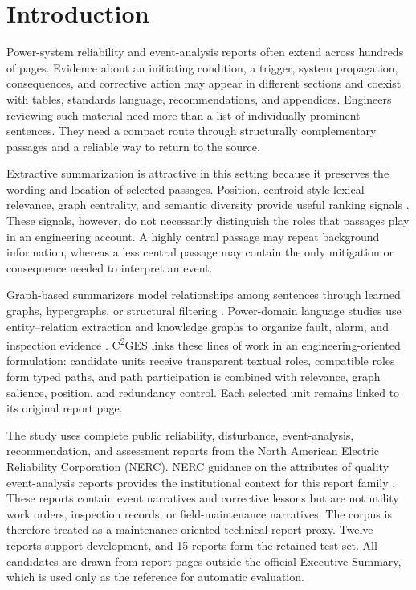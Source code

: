 \documentclass[applsci,article,submit,moreauthors]{Definitions/mdpi}
\newcommand{\cges}{C\textsuperscript{2}GES}
\begin{document}
\section{Introduction}

Power-system reliability and event-analysis reports often extend across hundreds of pages. Evidence about an initiating condition, a trigger, system propagation, consequences, and corrective action may appear in different sections and coexist with tables, standards language, recommendations, and appendices. Engineers reviewing such material need more than a list of individually prominent sentences. They need a compact route through structurally complementary passages and a reliable way to return to the source.

Extractive summarization is attractive in this setting because it preserves the wording and location of selected passages. Position, centroid-style lexical relevance, graph centrality, and semantic diversity provide useful ranking signals \cite{zhong2020extractive,bi2021aredsum,liu2021unsupervised,mihalcea2004textrank,reimers2019sentencebert}. These signals, however, do not necessarily distinguish the roles that passages play in an engineering account. A highly central passage may repeat background information, whereas a less central passage may contain the only mitigation or consequence needed to interpret an event.

Graph-based summarizers model relationships among sentences through learned graphs, hypergraphs, or structural filtering \cite{siragusa2022sentencegraph,onan2024mches,hark2025mis}. Power-domain language studies use entity--relation extraction and knowledge graphs to organize fault, alarm, and inspection evidence \cite{liu2022powerfault,ma2025alarm,zgg2026bridge}. \cges{} links these lines of work in an engineering-oriented formulation: candidate units receive transparent textual roles, compatible roles form typed paths, and path participation is combined with relevance, graph salience, position, and redundancy control. Each selected unit remains linked to its original report page.

The study uses complete public reliability, disturbance, event-analysis, recommendation, and assessment reports from the North American Electric Reliability Corporation (NERC). NERC guidance on the attributes of quality event-analysis reports provides the institutional context for this report family \cite{nerc2015qualityreport}. These reports contain event narratives and corrective lessons but are not utility work orders, inspection records, or field-maintenance narratives. The corpus is therefore treated as a maintenance-oriented technical-report proxy. Twelve reports support development, and 15 reports form the retained test set. All candidates are drawn from report pages outside the official Executive Summary, which is used only as the reference for automatic evaluation.
\end{document}
